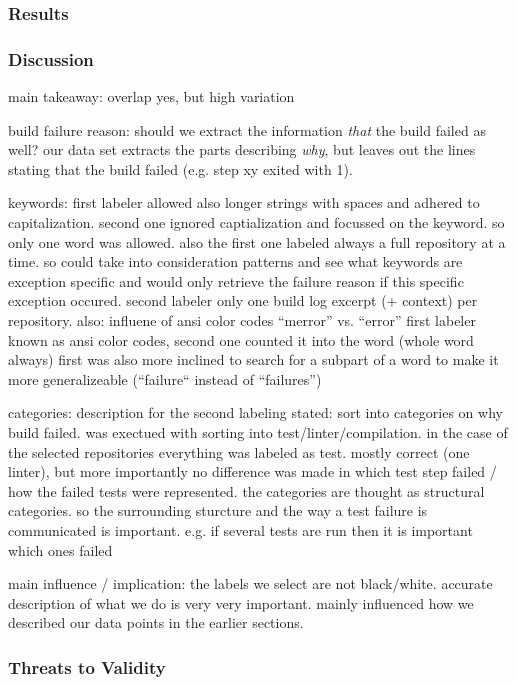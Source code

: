 \documentclass[\myrootdir/main.tex]{subfiles}
\begin{document}
\subsubsection{Results}

\subsubsection{Discussion}
main takeaway: overlap yes, but high variation 

build failure reason: should we extract the information \emph{that} the build failed as well?
our data set extracts the parts describing \emph{why}, but leaves out the lines stating that the build failed (e.g. step xy exited with 1).

keywords: first labeler allowed also longer strings with spaces and adhered to capitalization.
second one ignored captialization and focussed on the keyword.
so only one word was allowed.
also the first one labeled always a full repository at a time.
so could take into consideration patterns and see what keywords are exception specific and would only retrieve the failure reason if this specific exception occured.
second labeler only one build log excerpt (+ context) per repository.
also: influene of ansi color codes ``merror'' vs. ``error'' first labeler known as ansi color codes, second one counted it into the word (whole word always)
first was also more inclined to search for a subpart of a word to make it more generalizeable (``failure`` instead of ``failures'')

categories: description for the second labeling stated: sort into categories on why build failed.
was exectued with sorting into test/linter/compilation.
in the case of the selected repositories everything was labeled as test. mostly correct (one linter), but more importantly no difference was made in which test step failed / how the failed tests were represented.
the categories are thought as structural categories.
so the surrounding sturcture and the way a test failure is communicated is important. e.g. if several tests are run then it is important which ones failed

main influence / implication: the labels we select are not black/white. accurate description of what we do is very very important. mainly influenced how we described our data points in the earlier sections.
\subsubsection{Threats to Validity}
\end{document}
